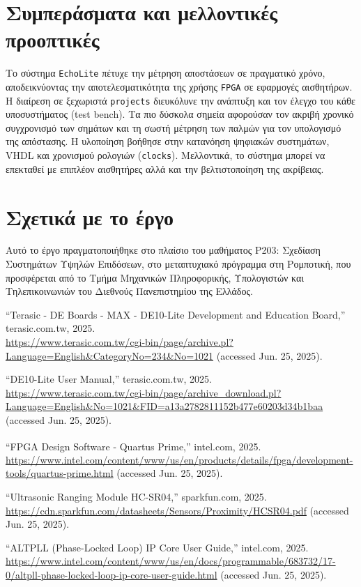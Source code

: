 \documentclass[conference]{IEEEtran}
\begin{document}
\section{Συμπεράσματα και μελλοντικές προοπτικές}
Το σύστημα \texttt{EchoLite} πέτυχε την μέτρηση αποστάσεων σε πραγματικό χρόνο, αποδεικνύοντας την αποτελεσματικότητα της χρήσης \texttt{FPGA} σε εφαρμογές αισθητήρων. Η διαίρεση σε ξεχωριστά \texttt{projects} διευκόλυνε την ανάπτυξη και τον έλεγχο του κάθε υποσυστήματος (test bench).
Τα πιο δύσκολα σημεία αφορούσαν τον ακριβή χρονικό συγχρονισμό των σημάτων και τη σωστή μέτρηση των παλμών για τον υπολογισμό της απόστασης. Η υλοποίηση βοήθησε στην κατανόηση ψηφιακών συστημάτων, VHDL και χρονισμού ρολογιών (\texttt{clocks}).
Μελλοντικά, το σύστημα μπορεί να επεκταθεί με επιπλέον αισθητήρες αλλά και την βελτιστοποίηση της ακρίβειας.

\section{Σχετικά με το έργο}
Αυτό το έργο πραγματοποιήθηκε στο πλαίσιο του μαθήματος Ρ203: Σχεδίαση Συστημάτων Υψηλών Επιδόσεων, στο μεταπτυχιακό πρόγραμμα στη Ρομποτική, που προσφέρεται από το Τμήμα Μηχανικών Πληροφορικής, Υπολογιστών και Τηλεπικοινωνιών του Διεθνούς Πανεπιστημίου της Ελλάδος.

 \enlargethispage{0mm}
\begin{thebibliography}{00}

``Terasic - DE Boards - MAX - DE10-Lite Development and Education Board,'' terasic.com.tw, 2025.\\
\url{https://www.terasic.com.tw/cgi-bin/page/archive.pl?Language=English&CategoryNo=234&No=1021} (accessed Jun. 25, 2025).

``DE10-Lite User Manual,'' terasic.com.tw, 2025.\\
\url{https://www.terasic.com.tw/cgi-bin/page/archive_download.pl?Language=English&No=1021&FID=a13a2782811152b477e60203d34b1baa} (accessed Jun. 25, 2025).

``FPGA Design Software - Quartus\textsuperscript{\textregistered} Prime,'' intel.com, 2025.\\
\url{https://www.intel.com/content/www/us/en/products/details/fpga/development-tools/quartus-prime.html} (accessed Jun. 25, 2025).

``Ultrasonic Ranging Module HC-SR04,'' sparkfun.com, 2025.\\
\url{https://cdn.sparkfun.com/datasheets/Sensors/Proximity/HCSR04.pdf} (accessed Jun. 25, 2025).

``ALTPLL (Phase-Locked Loop) IP Core User Guide,'' intel.com, 2025.\\
\url{https://www.intel.com/content/www/us/en/docs/programmable/683732/17-0/altpll-phase-locked-loop-ip-core-user-guide.html} (accessed Jun. 25, 2025).

\end{thebibliography}
\end{document}
